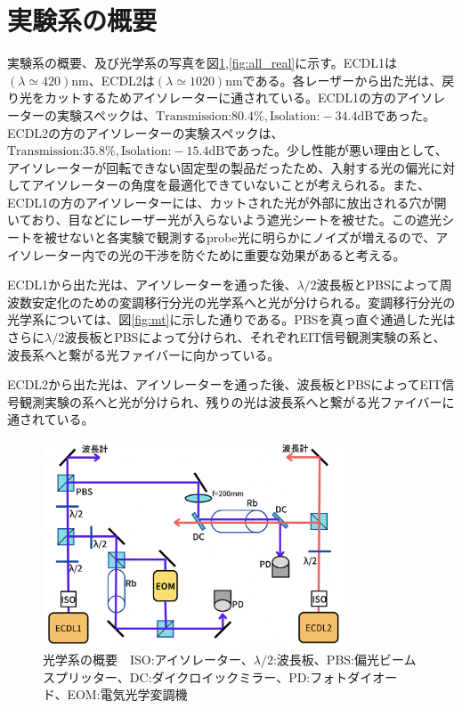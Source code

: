 \documentclass[dvipdfmx]{jsreport}
\begin{document}
\section{実験系の概要}
実験系の概要、及び光学系の写真を図\ref{fig:all},\ref{fig:all_real}に示す。ECDL1は$(\lambda \simeq 420)$nm、ECDL2は$(\lambda \simeq 1020)$nmである。各レーザーから出た光は、戻り光をカットするためアイソレーターに通されている。ECDL1の方のアイソレーターの実験スペックは、$\text{Transmission:} 80.4\%, \text{Isolation:} -34.4\text{dB}$であった。ECDL2の方のアイソレーターの実験スペックは、$\text{Transmission:} 35.8\%, \text{Isolation:} -15.4\text{dB}$であった。少し性能が悪い理由として、アイソレーターが回転できない固定型の製品だったため、入射する光の偏光に対してアイソレーターの角度を最適化できていないことが考えられる。また、ECDL1の方のアイソレーターには、カットされた光が外部に放出される穴が開いており、目などにレーザー光が入らないよう遮光シートを被せた。この遮光シートを被せないと各実験で観測するprobe光に明らかにノイズが増えるので、アイソレーター内での光の干渉を防ぐために重要な効果があると考える。

ECDL1から出た光は、アイソレーターを通った後、$\lambda/2$波長板とPBSによって周波数安定化のための変調移行分光の光学系へと光が分けられる。変調移行分光の光学系については、図\ref{fig:mt}に示した通りである。PBSを真っ直ぐ通過した光はさらに$\lambda/2$波長板とPBSによって分けられ、それぞれEIT信号観測実験の系と、波長系へと繋がる光ファイバーに向かっている。

ECDL2から出た光は、アイソレーターを通った後、波長板とPBSによってEIT信号観測実験の系へと光が分けられ、残りの光は波長系へと繋がる光ファイバーに通されている。

\begin{figure}[hbtp]
\centering
\includegraphics[width=0.8\textwidth]{images/all.png}
\caption{\label{fig:all}光学系の概要　ISO:アイソレーター、$\lambda / 2$:波長板、PBS:偏光ビームスプリッター、DC:ダイクロイックミラー、PD:フォトダイオード、EOM:電気光学変調機}
\end{figure}
\end{document}
